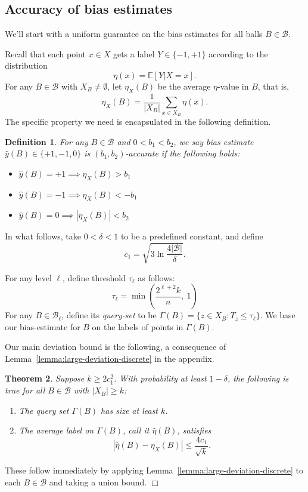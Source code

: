 \documentclass{article}
\def\E{{\mathbb E}}
\def\B{{\mathcal B}}
\def\yh{{\widehat{y}}}
\newtheorem{thm}{Theorem}
\newtheorem{defn}[thm]{Definition}
\newenvironment{proof}{\noindent {\sc Proof:}}{$\Box$ \medskip}
\begin{document}
\subsection{Accuracy of bias estimates}

We'll start with a uniform guarantee on the bias estimates for all balls $B \in \B$.

Recall that each point $x \in X$ gets a label $Y \in \{-1,+1\}$ according to the distribution
$$ \eta(x) = \E[Y | X=x].$$ 
For any $B \in \B$ with $X_B \neq \emptyset$, let $\eta_X(B)$ be the average $\eta$-value in $B$, that is,
$$ \eta_X(B) = \frac{1}{|X_B|} \sum_{x \in X_B} \eta(x) .$$
The specific property we need is encapsulated in the following definition.
\begin{defn}
For any $B \in \B$ and $0 < b_1 < b_2$, we say bias estimate $\yh(B) \in \{+1,-1,0\}$ is \emph{$(b_1,b_2)$-accurate} if the following holds:
\begin{itemize}
\item $\yh(B) = +1 \implies \eta_X(B) > b_1$
\item $\yh(B) = -1 \implies \eta_X(B) < -b_1$
\item $\yh(B) = 0 \implies |\eta_X(B)| < b_2$
\end{itemize}
\label{def:accurate-bias-estimate}
\end{defn}

In what follows, take $0 < \delta < 1$ to be a predefined constant, and define
\begin{equation}
c_1 = \sqrt{3 \ln \frac{4|\B|}{\delta}} .
\label{eq:c1}
\end{equation}

For any level $\ell$, define threshold $\tau_\ell$ as follows:
\begin{equation}
\tau_\ell = \min \left( \frac{2^{\ell+2}k}{n}, \ 1 \right)
\label{eq:threshold-ell}
\end{equation}
For any $B \in \B_\ell$, define its \emph{query-set} to be $\Gamma(B) = \{z \in X_B: T_z \leq \tau_\ell\}$. We base our bias-estimate for $B$ on the labels of points in $\Gamma(B)$.

Our main deviation bound is the following, a consequence of Lemma~\ref{lemma:large-deviation-discrete} in the appendix.

\begin{thm}
Suppose $k \geq 2c_1^2$. With probability at least $1-\delta$, the following is true for all $B \in \B$ with $|X_B| \geq k$:
\begin{enumerate}
\item[(a)] The query set $\Gamma(B)$ has size at least $k$.
\item[(b)] The average label on $\Gamma(B)$, call it $\widehat{\eta}(B)$, satisfies
$$ \left| \widehat{\eta}(B) - \eta_X(B) \right| \leq \frac{4c_1}{\sqrt{k}}.$$
\end{enumerate}
\label{thm:large-deviation-bounds}
\end{thm}
\begin{proof}
These follow immediately by applying Lemma~\ref{lemma:large-deviation-discrete} to each $B \in \B$ and taking a union bound. 
\end{proof}
\end{document}
